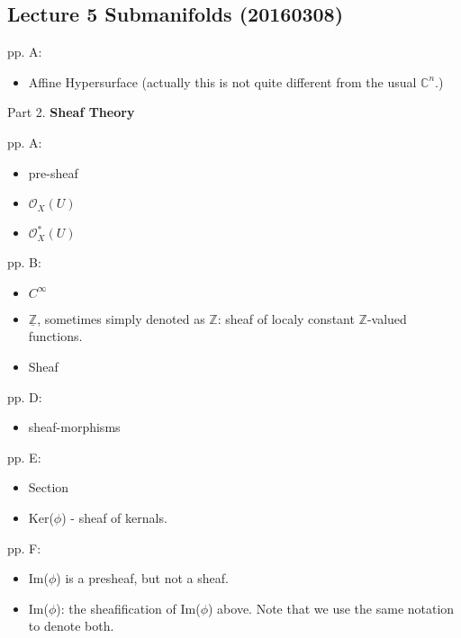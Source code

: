 \documentclass{article}
\numberwithin{equation}{subsection} %
\begin{document}
	\subsection{Lecture 5 Submanifolds (20160308)}
	
	pp. A:
		\begin{itemize}
			\item Affine Hypersurface (actually this is not quite different from the usual $\mathbb{C}^n$.)
		\end{itemize}
	
	Part 2. \textbf{Sheaf Theory}
	
	pp. A:
		\begin{itemize}
			\item pre-sheaf
			\item $\mathcal{O}_X(U)$
			\item $\mathcal{O}^*_X(U)$
		\end{itemize}
	pp. B:
		\begin{itemize}
			\item $C^{\infty}$
			\item $\mathbb{\underline{Z}}$, sometimes simply denoted as $\mathbb{Z}$: sheaf of localy constant $\mathbb{Z}$-valued functions.
			\item Sheaf
		\end{itemize}
	pp. D:
		\begin{itemize}
			\item sheaf-morphisms
		\end{itemize}
	pp. E:
		\begin{itemize}
			\item Section
			\item Ker($\phi$) - sheaf of kernals.
		\end{itemize}
	pp. F:
		\begin{itemize}
			\item Im($\phi$) is a presheaf, but not a sheaf.
			\item Im($\phi$): the sheafification of Im($\phi$) above. Note that we use the same notation to denote both.
		\end{itemize}
	
\end{document}

